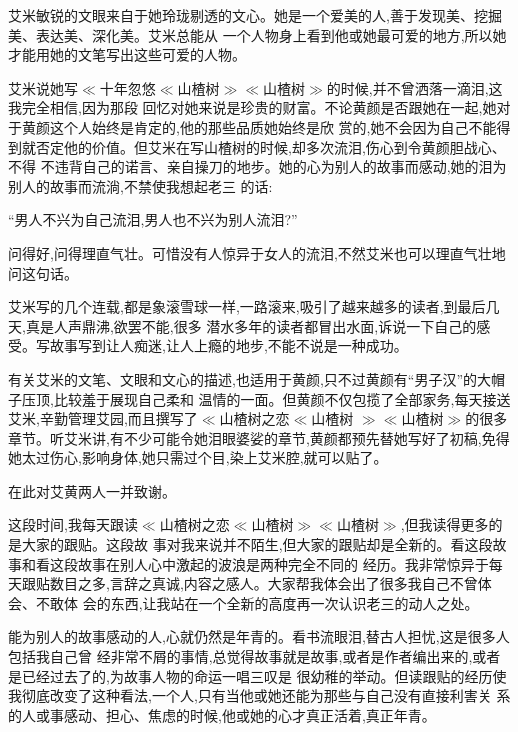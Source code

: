 ﻿\documentclass[12pt]{article}
\begin{document}
艾米敏锐的文眼来自于她玲珑剔透的文心。她是一个爱美的人,善于发现美、挖掘美、表达美、深化美。艾米总能从
一个人物身上看到他或她最可爱的地方,所以她才能用她的文笔写出这些可爱的人物。



艾米说她写$\ll$十年忽悠$\ll$山楂树$\gg$$\ll$山楂树$\gg$的时候,并不曾洒落一滴泪,这我完全相信,因为那段
回忆对她来说是珍贵的财富。不论黄颜是否跟她在一起,她对于黄颜这个人始终是肯定的,他的那些品质她始终是欣
赏的,她不会因为自己不能得到就否定他的价值。但艾米在写山楂树的时候,却多次流泪,伤心到令黄颜胆战心、不得
不违背自己的诺言、亲自操刀的地步。她的心为别人的故事而感动,她的泪为别人的故事而流淌,不禁使我想起老三
的话:



``男人不兴为自己流泪,男人也不兴为别人流泪?''



问得好,问得理直气壮。可惜没有人惊异于女人的流泪,不然艾米也可以理直气壮地问这句话。



艾米写的几个连载,都是象滚雪球一样,一路滚来,吸引了越来越多的读者,到最后几天,真是人声鼎沸,欲罢不能,很多
潜水多年的读者都冒出水面,诉说一下自己的感受。写故事写到让人痴迷,让人上瘾的地步,不能不说是一种成功。



有关艾米的文笔、文眼和文心的描述,也适用于黄颜,只不过黄颜有``男子汉''的大帽子压顶,比较羞于展现自己柔和
温情的一面。但黄颜不仅包揽了全部家务,每天接送艾米,辛勤管理艾园,而且撰写了$\ll$山楂树之恋$\ll$山楂树
$\gg$$\ll$山楂树$\gg$的很多章节。听艾米讲,有不少可能令她泪眼婆娑的章节,黄颜都预先替她写好了初稿,免得
她太过伤心,影响身体,她只需过个目,染上艾米腔,就可以贴了。


在此对艾黄两人一并致谢。



这段时间,我每天跟读$\ll$山楂树之恋$\ll$山楂树$\gg$$\ll$山楂树$\gg$,但我读得更多的是大家的跟贴。这段故
事对我来说并不陌生,但大家的跟贴却是全新的。看这段故事和看这段故事在别人心中激起的波浪是两种完全不同的
经历。我非常惊异于每天跟贴数目之多,言辞之真诚,内容之感人。大家帮我体会出了很多我自己不曾体会、不敢体
会的东西,让我站在一个全新的高度再一次认识老三的动人之处。



能为别人的故事感动的人,心就仍然是年青的。看书流眼泪,替古人担忧,这是很多人\myrule 包括我自己\myrule 曾
经非常不屑的事情,总觉得故事就是故事,或者是作者编出来的,或者是已经过去了的,为故事人物的命运一唱三叹是
很幼稚的举动。但读跟贴的经历使我彻底改变了这种看法,一个人,只有当他或她还能为那些与自己没有直接利害关
系的人或事感动、担心、焦虑的时候,他或她的心才真正活着,真正年青。
\end{document}
